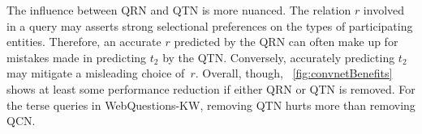 \documentclass{svjour3}
\begin{document}
The influence between QRN and QTN is more nuanced.  The relation $r$ involved in a query may asserts strong selectional preferences on the types of participating entities.  Therefore, an accurate $r$ predicted by the QRN can often make up for mistakes made in predicting $t_2$ by the QTN.  Conversely, accurately predicting $t_2$ may mitigate a misleading choice of~$r$.  Overall, though, \tablename~\ref{fig:convnetBenefits} shows at least some performance reduction if either QRN or QTN is removed.  For the terse queries in WebQuestions-KW, removing QTN hurts more than removing QCN.


\end{document}
